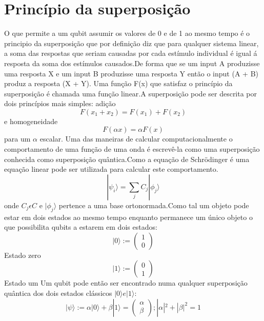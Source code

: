 \documentclass{report}
\begin{document}
\section{Princípio da superposição}
O que permite a um qubit assumir os valores de 0 e de 1 ao mesmo tempo é o principio da superposição que por definição diz que para qualquer sistema linear, a soma das respostas que seriam causadas por cada estímulo individual é igual á resposta da soma dos estímulos causados.De forma que se um input A produzisse uma resposta X e um input B produzisse uma resposta Y então o input (A + B) produz a resposta (X + Y).
Uma função F(x) que satisfaz o princípio da superposição é chamada uma função linear.A superposição pode ser descrita por dois princípios mais simples: adição
\begin{equation}
    F(x_1 + x_2) = F(x_1) + F(x_2)
\end{equation}
e homogeneidade
\begin{equation}
    F(\alpha x) = \alpha F(x)
\end{equation}
para um \(\alpha\) escalar.
Uma das maneiras de calcular computacionalmente o comportamento de uma função de uma onda é escrevê-la como uma superposição conhecida como superposição quântica.Como a equação de Schrödinger é uma equação linear pode ser utilizada para calcular este comportamento.
\begin{equation}
    |\psi_i\rangle = \sum_{j}C_j|\phi_j\rangle
\end{equation}
onde \(C_j \epsilon C\) e \(|\phi_j\rangle\) pertence a uma base ortonormada.Como tal um objeto pode estar em dois estados ao mesmo tempo enquanto permanece um único objeto o que possibilita qubits a estarem em dois estados:
\newline\begin{equation}
    |0\rangle:=\begin{pmatrix}1\\0\end{pmatrix}
\end{equation}
\newline Estado zero
\newline\begin{equation}
    |1\rangle := \begin{pmatrix}0\\1\end{pmatrix}
\end{equation}
\newline Estado um
\newline\newline Um qubit pode então ser encontrado numa qualquer superposição quântica dos dois estados clássicos 
\(|0\rangle e |1\rangle:\)
\newline
\begin{equation}
        |\psi\rangle := \alpha |0\rangle + \beta |1\rangle =\begin{pmatrix}
    \alpha \\ \beta 
\end{pmatrix};|\alpha|^2+|\beta|^2 = 1
\end{equation}
\end{document}
